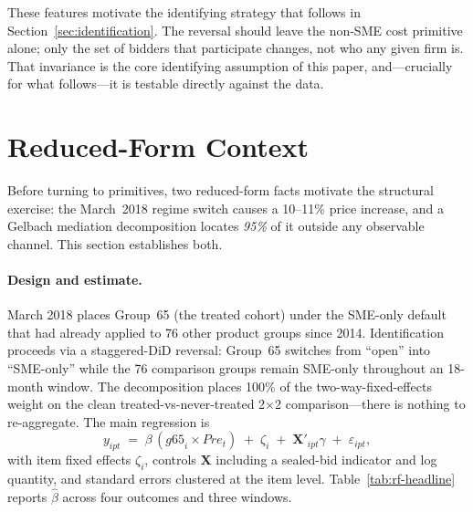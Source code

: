 \documentclass[12pt]{article}
\begin{document}
These features motivate the identifying strategy that follows in
Section~\ref{sec:identification}. The reversal should leave the
non-SME cost primitive alone; only the set of bidders that
participate changes, not who any given firm is. That invariance
is the core identifying assumption of this paper, and---crucially
for what follows---it is testable directly against the data.

\section{Reduced-Form Context}
\label{sec:rf}

Before turning to primitives, two reduced-form facts motivate the
structural exercise: the March~2018 regime switch causes a 10--11\%
price increase, and a Gelbach mediation decomposition locates
\emph{95\%} of it outside any observable channel. This section
establishes both.

\paragraph{Design and estimate.}
March 2018 places Group~65 (the treated cohort) under the
SME-only default that had already applied to 76 other product
groups since 2014. Identification proceeds via a staggered-DiD
reversal: Group~65 switches from ``open'' into ``SME-only'' while
the 76 comparison groups remain SME-only throughout an 18-month
window. The \citet{goodmanbacon2021} decomposition places 100\%
of the two-way-fixed-effects weight on the clean
treated-vs-never-treated 2$\times$2 comparison---there is nothing
to re-aggregate. The main regression is
\begin{equation}
y_{ipt} \;=\; \beta\,(\mathit{g65}_i \times \mathit{Pre}_t)
\;+\; \zeta_i \;+\; \mathbf{X}'_{ipt}\gamma \;+\; \varepsilon_{ipt},
\label{eq:did-main}
\end{equation}
with item fixed effects $\zeta_i$, controls $\mathbf{X}$ including
a sealed-bid indicator and log quantity, and standard errors
clustered at the item level. Table~\ref{tab:rf-headline} reports
$\hat\beta$ across four outcomes and three windows.
\end{document}

